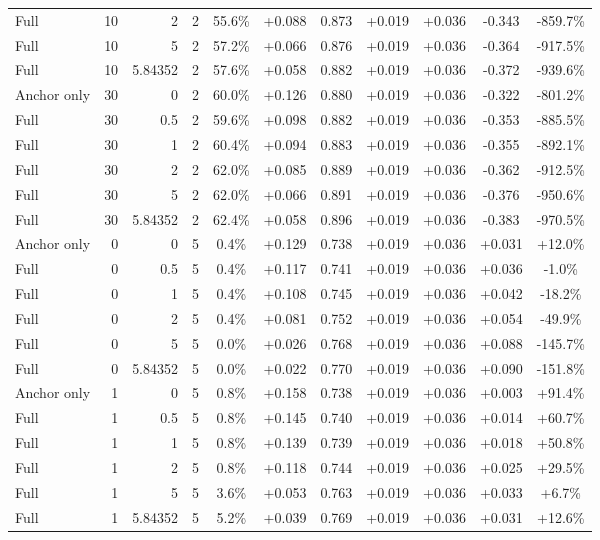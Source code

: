 \begin{table}[htbp]
\begin{tabular}{lrrrccccccc}
Full & 10 & 2 & 2 & 55.6\% & +0.088 & 0.873 & +0.019 & +0.036 & -0.343 & -859.7\% \\
Full & 10 & 5 & 2 & 57.2\% & +0.066 & 0.876 & +0.019 & +0.036 & -0.364 & -917.5\% \\
Full & 10 & 5.84352 & 2 & 57.6\% & +0.058 & 0.882 & +0.019 & +0.036 & -0.372 & -939.6\% \\
Anchor only & 30 & 0 & 2 & 60.0\% & +0.126 & 0.880 & +0.019 & +0.036 & -0.322 & -801.2\% \\
Full & 30 & 0.5 & 2 & 59.6\% & +0.098 & 0.882 & +0.019 & +0.036 & -0.353 & -885.5\% \\
Full & 30 & 1 & 2 & 60.4\% & +0.094 & 0.883 & +0.019 & +0.036 & -0.355 & -892.1\% \\
Full & 30 & 2 & 2 & 62.0\% & +0.085 & 0.889 & +0.019 & +0.036 & -0.362 & -912.5\% \\
Full & 30 & 5 & 2 & 62.0\% & +0.066 & 0.891 & +0.019 & +0.036 & -0.376 & -950.6\% \\
Full & 30 & 5.84352 & 2 & 62.4\% & +0.058 & 0.896 & +0.019 & +0.036 & -0.383 & -970.5\% \\
Anchor only & 0 & 0 & 5 & 0.4\% & +0.129 & 0.738 & +0.019 & +0.036 & +0.031 & +12.0\% \\
Full & 0 & 0.5 & 5 & 0.4\% & +0.117 & 0.741 & +0.019 & +0.036 & +0.036 & -1.0\% \\
Full & 0 & 1 & 5 & 0.4\% & +0.108 & 0.745 & +0.019 & +0.036 & +0.042 & -18.2\% \\
Full & 0 & 2 & 5 & 0.4\% & +0.081 & 0.752 & +0.019 & +0.036 & +0.054 & -49.9\% \\
Full & 0 & 5 & 5 & 0.0\% & +0.026 & 0.768 & +0.019 & +0.036 & +0.088 & -145.7\% \\
Full & 0 & 5.84352 & 5 & 0.0\% & +0.022 & 0.770 & +0.019 & +0.036 & +0.090 & -151.8\% \\
Anchor only & 1 & 0 & 5 & 0.8\% & +0.158 & 0.738 & +0.019 & +0.036 & +0.003 & +91.4\% \\
Full & 1 & 0.5 & 5 & 0.8\% & +0.145 & 0.740 & +0.019 & +0.036 & +0.014 & +60.7\% \\
Full & 1 & 1 & 5 & 0.8\% & +0.139 & 0.739 & +0.019 & +0.036 & +0.018 & +50.8\% \\
Full & 1 & 2 & 5 & 0.8\% & +0.118 & 0.744 & +0.019 & +0.036 & +0.025 & +29.5\% \\
Full & 1 & 5 & 5 & 3.6\% & +0.053 & 0.763 & +0.019 & +0.036 & +0.033 & +6.7\% \\
Full & 1 & 5.84352 & 5 & 5.2\% & +0.039 & 0.769 & +0.019 & +0.036 & +0.031 & +12.6\% \\

\end{tabular}
\end{table}
